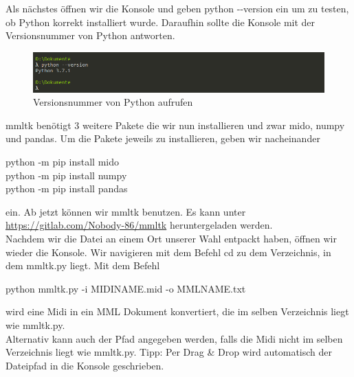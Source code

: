 \bigskip

Als nächstes öffnen wir die Konsole und geben python -{}-version ein um zu testen, ob Python korrekt installiert wurde. Daraufhin sollte die Konsole mit der Versionsnummer von Python antworten.

\begin{figure}[htbp] \centering
	\includegraphics[width=.95\linewidth]{images/Python.png}
	\caption{Versionsnummer von Python aufrufen}
	\label{Python}
\end{figure}

mmltk benötigt 3 weitere Pakete die wir nun installieren und zwar mido, numpy und pandas.
Um die Pakete jeweils zu installieren, geben wir nacheinander

\bigskip

python -m pip install mido \\
python -m pip install numpy \\
python -m pip install pandas

\bigskip

ein. Ab jetzt können wir mmltk benutzen. Es kann unter \href{https://gitlab.com/Nobody-86/mmltk}{https://gitlab.com/Nobody-86/mmltk} heruntergeladen werden. \\
Nachdem wir die Datei an einem Ort unserer Wahl entpackt haben, öffnen wir wieder die Konsole.
Wir navigieren mit dem Befehl cd zu dem Verzeichnis, in dem mmltk.py liegt. Mit dem Befehl

\bigskip

python mmltk.py -i  \dq MIDINAME.mid\dq{} -o \dq MMLNAME.txt\dq{}

\bigskip

wird eine Midi in ein MML Dokument konvertiert, die im selben Verzeichnis liegt wie mmltk.py. \\
Alternativ kann auch der Pfad angegeben werden, falls die Midi nicht im selben Verzeichnis liegt wie mmltk.py. Tipp: Per Drag \& Drop wird automatisch der Dateipfad in die Konsole geschrieben.

